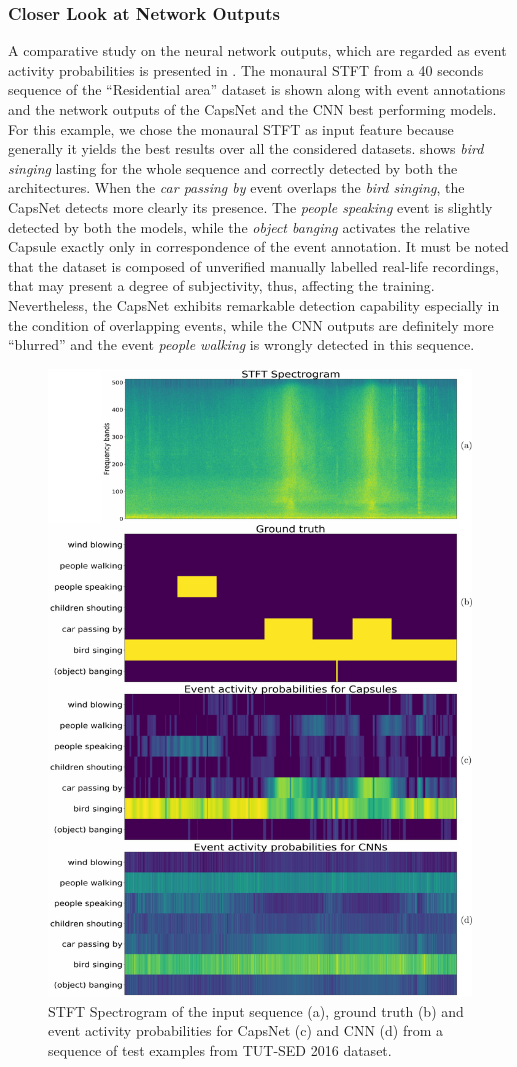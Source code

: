 \subsubsection{Closer Look at Network Outputs}
A comparative study on the neural network outputs, which are regarded as event activity probabilities is presented in . The monaural STFT from a 40 seconds sequence of the ``Residential area'' dataset is shown along with event annotations and the network outputs of the CapsNet and the CNN best performing models. For this example, we chose the monaural STFT as input feature because generally it yields the best results over all the considered datasets.  shows \textit{bird singing} lasting for the whole sequence and correctly detected by both the architectures. When the \textit{car passing by} event overlaps the \textit{bird singing}, the CapsNet detects more clearly its presence. The \textit{people speaking} event is slightly detected by both the models, while the \textit{object banging} activates the relative Capsule exactly only in correspondence of the event annotation. It must be noted that the dataset is composed of unverified manually labelled real-life recordings, that may present a degree of subjectivity, thus, affecting the training. Nevertheless, the CapsNet exhibits remarkable detection capability especially in the condition of overlapping events, while the CNN outputs are definitely more ``blurred'' and the event \textit{people walking} is wrongly detected in this sequence. 

\begin{figure}[h!]
	\centering
	\includegraphics[width=0.5\columnwidth]{img/activations}
	\caption[Polyphonic SED - Network outputs I]{STFT Spectrogram of the input sequence (a), ground truth (b) and event activity probabilities for CapsNet (c) and CNN (d) from a sequence of test examples from TUT-SED 2016 dataset.}
	\label{fig:activations}
\end{figure}



